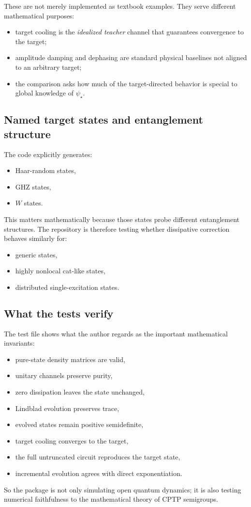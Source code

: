 \documentclass[11pt,a4paper]{article}
\begin{document}
These are not merely implemented as textbook examples. They serve different mathematical purposes:
\begin{itemize}
  \item target cooling is the \emph{idealized teacher} channel that guarantees convergence to the target;
  \item amplitude damping and dephasing are standard physical baselines not aligned to an arbitrary target;
  \item the comparison asks how much of the target-directed behavior is special to global knowledge of $\psi_\star$.
\end{itemize}

\subsection{Named target states and entanglement structure}
The code explicitly generates:
\begin{itemize}
  \item Haar-random states,
  \item GHZ states,
  \item $W$ states.
\end{itemize}
This matters mathematically because those states probe different entanglement structures. The repository is therefore testing whether dissipative correction behaves similarly for:
\begin{itemize}
  \item generic states,
  \item highly nonlocal cat-like states,
  \item distributed single-excitation states.
\end{itemize}

\subsection{What the tests verify}
The test file  shows what the author regards as the important mathematical invariants:
\begin{itemize}
  \item pure-state density matrices are valid,
  \item unitary channels preserve purity,
  \item zero dissipation leaves the state unchanged,
  \item Lindblad evolution preserves trace,
  \item evolved states remain positive semidefinite,
  \item target cooling converges to the target,
  \item the full untruncated circuit reproduces the target state,
  \item incremental evolution agrees with direct exponentiation.
\end{itemize}
So the package is not only simulating open quantum dynamics; it is also testing numerical faithfulness to the mathematical theory of CPTP semigroups.
\end{document}
